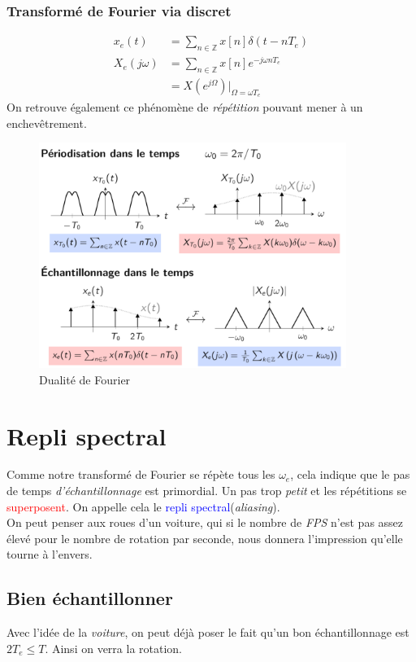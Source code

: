 \documentclass{report}
\begin{document}
\subsubsection{Transformé de Fourier via discret}
\begin{align*}
x_e(t)&= \sum_{n \in \mathbb{Z}} x[n]\delta(t-nT_e)\\
X_e(j\omega) &= \sum_{n \in \mathbb{Z}} x[n] e^{-j \omega n T_e}\\
&= X(e^{j\Omega})\vert_{\Omega = \omega T_e}
\end{align*}
On retrouve également ce phénomène de \textit{répétition} pouvant mener à un enchevêtrement.

\begin{figure}[H]
\centering
\includegraphics[width=10cm]{img/dua.png}
\caption{Dualité de Fourier}
\end{figure}

\section{Repli spectral} \label{spec}
Comme notre transformé de Fourier se répète tous les $\omega_e$, cela indique que le pas de temps \textit{d'échantillonnage} est primordial. Un pas trop \textit{petit} et les répétitions se \textcolor{red}{superposent}. On appelle cela le \textcolor{blue}{repli spectral}(\textit{aliasing}).\\
On peut penser aux roues d'un voiture, qui si le nombre de \textit{FPS} n'est pas assez élevé pour le nombre de rotation par seconde, nous donnera l'impression qu'elle tourne à l'envers.

\subsection{Bien échantillonner}
Avec l'idée de la \textit{voiture}, on peut déjà poser le fait qu'un bon échantillonnage est $2T_e \leq T$. Ainsi on verra la rotation.
\end{document}
